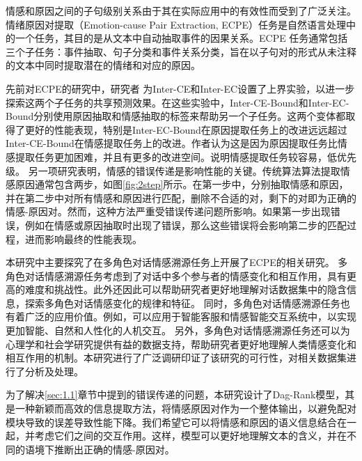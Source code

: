 情感和原因之间的子句级别关系由于其在实际应用中的有效性而受到了广泛关注。情绪原因对提取（Emotion-cause Pair Extraction, ECPE）任务是自然语言处理中的一个任务，其目的是从文本中自动抽取事件的因果关系。ECPE 任务通常包括三个子任务：事件抽取、句子分类和事件关系分类，旨在以子句对的形式从未注释的文本中同时提取潜在的情绪和对应的原因。


先前对ECPE的研究中，研究者  为Inter-CE和Inter-EC设置了上界实验，以进一步探索这两个子任务的共享预测效果。在这些实验中，Inter-CE-Bound和Inter-EC-Bound分别使用原因抽取和情感抽取的标签来帮助另一个子任务。这两个变体都取得了更好的性能表现，特别是Inter-EC-Bound在原因提取任务上的改进远远超过Inter-CE-Bound在情感提取任务上的改进。作者认为这是因为原因提取任务比情感提取任务更加困难，并且有更多的改进空间。说明情感提取任务较容易，低优先级。
另一项研究表明，情感的错误传递是影响性能的关键。传统算法算法提取情感原因通常包含两步，如图\ref{fig:2step}所示。在第一步中，分别抽取情感和原因，并在第二步中对所有情感和原因进行匹配，删除不合适的对，剩下的对即为正确的情感-原因对。然而，这种方法严重受错误传递问题所影响。如果第一步出现错误，例如在情感或原因抽取时出现了错误，那么这些错误将会影响第二步的匹配过程，进而影响最终的性能表现。


 



本研究中主要探究了在多角色对话情感溯源任务上开展了ECPE的相关研究。
多角色对话情感溯源任务考虑到了对话中多个参与者的情感变化和相互作用，具有更高的难度和挑战性。此外还因此可以帮助研究者更好地理解对话数据集中的隐含信息，探索多角色对话情感变化的规律和特征。
同时，多角色对话情感溯源任务也有着广泛的应用价值。例如，可以应用于智能客服和情感智能交互系统中，以实现更加智能、自然和人性化的人机交互。
另外，多角色对话情感溯源任务还可以为心理学和社会学研究提供有益的数据支持，帮助研究者更好地理解人类情感变化和相互作用的机制。本研究进行了广泛调研印证了该研究的可行性，对相关数据集进行了分析及处理。

为了解决\ref{sec:1.1}章节中提到的错误传递的问题，本研究设计了Dag-Rank模型，其是一种新颖而高效的信息提取方法，将情感原因对作为一个整体输出，以避免配对模块导致的误差导致性能下降。我们希望它可以将情感和原因的语义信息结合在一起，并考虑它们之间的交互作用。这样，模型可以更好地理解文本的含义，并在不同的语境下推断出正确的情感-原因对。

